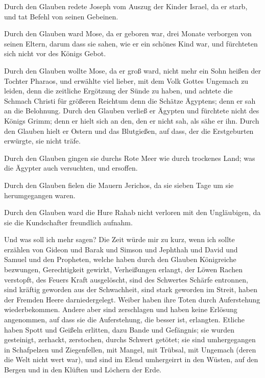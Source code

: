  Durch den Glauben redete Joseph vom Auszug der Kinder
Israel, da er starb, und tat Befehl von seinen Gebeinen.

 Durch den Glauben ward Mose, da er geboren war, drei
Monate verborgen von seinen Eltern, darum dass sie sahen, wie er ein
schönes Kind war, und fürchteten sich nicht vor des Königs Gebot.

 Durch den Glauben wollte Mose, da er groß ward, nicht mehr
ein Sohn heißen der Tochter Pharaos,  und erwählte viel
lieber, mit dem Volk Gottes Ungemach zu leiden, denn die zeitliche
Ergötzung der Sünde zu haben,  und achtete die Schmach
Christi für größeren Reichtum denn die Schätze Ägyptens; denn er sah an
die Belohnung.  Durch den Glauben verließ er Ägypten und
fürchtete nicht des Königs Grimm; denn er hielt sich an den, den er
nicht sah, als sähe er ihn.  Durch den Glauben hielt er
Ostern und das Blutgießen, auf dass, der die Erstgeburten erwürgte, sie
nicht träfe.

 Durch den Glauben gingen sie durchs Rote Meer wie durch
trockenes Land; was die Ägypter auch versuchten, und ersoffen.

 Durch den Glauben fielen die Mauern Jerichos, da sie
sieben Tage um sie herumgegangen waren.

 Durch den Glauben ward die Hure Rahab nicht verloren mit
den Ungläubigen, da sie die Kundschafter freundlich aufnahm.

 Und was soll ich mehr sagen? Die Zeit würde mir zu kurz,
wenn ich sollte erzählen von Gideon und Barak und Simson und Jephthah
und David und Samuel und den Propheten,  welche haben durch
den Glauben Königreiche bezwungen, Gerechtigkeit gewirkt, Verheißungen
erlangt, der Löwen Rachen verstopft,  des Feuers Kraft
ausgelöscht, sind des Schwertes Schärfe entronnen, sind kräftig geworden
aus der Schwachheit, sind stark geworden im Streit, haben der Fremden
Heere darniedergelegt.  Weiber haben ihre Toten durch
Auferstehung wiederbekommen. Andere aber sind zerschlagen und haben
keine Erlösung angenommen, auf dass sie die Auferstehung, die besser
ist, erlangten.  Etliche haben Spott und Geißeln erlitten,
dazu Bande und Gefängnis;  sie wurden gesteinigt, zerhackt,
zerstochen, durchs Schwert getötet; sie sind umhergegangen in
Schafpelzen und Ziegenfellen, mit Mangel, mit Trübsal, mit Ungemach
 (deren die Welt nicht wert war), und sind im Elend
umhergeirrt in den Wüsten, auf den Bergen und in den Klüften und Löchern
der Erde.

